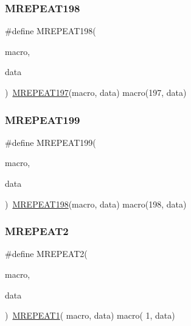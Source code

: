 \mbox{\label{group__group__sam0__utils__mrepeat_ga4061c0d7ba556ac993f2bcca14dd479c}} 
\subsubsection{\texorpdfstring{MREPEAT198}{MREPEAT198}}
{\footnotesize\ttfamily \#define M\+R\+E\+P\+E\+A\+T198(\begin{DoxyParamCaption}\item[{}]{macro,  }\item[{}]{data }\end{DoxyParamCaption})~\mbox{\hyperlink{group__group__sam0__utils__mrepeat_ga8d5a1466ff85f6b12ce43dd9a5edf7e5}{M\+R\+E\+P\+E\+A\+T197}}(macro, data)   macro(197, data)}

\mbox{\label{group__group__sam0__utils__mrepeat_gae89c87df1febe41c657bbbff536a77fa}} 
\subsubsection{\texorpdfstring{MREPEAT199}{MREPEAT199}}
{\footnotesize\ttfamily \#define M\+R\+E\+P\+E\+A\+T199(\begin{DoxyParamCaption}\item[{}]{macro,  }\item[{}]{data }\end{DoxyParamCaption})~\mbox{\hyperlink{group__group__sam0__utils__mrepeat_ga4061c0d7ba556ac993f2bcca14dd479c}{M\+R\+E\+P\+E\+A\+T198}}(macro, data)   macro(198, data)}

\mbox{\label{group__group__sam0__utils__mrepeat_gad5dcb0f9f91771b2e3e42b48d347cb76}} 
\subsubsection{\texorpdfstring{MREPEAT2}{MREPEAT2}}
{\footnotesize\ttfamily \#define M\+R\+E\+P\+E\+A\+T2(\begin{DoxyParamCaption}\item[{}]{macro,  }\item[{}]{data }\end{DoxyParamCaption})~\mbox{\hyperlink{group__group__sam0__utils__mrepeat_ga3abc77fc72ae2dcdd787ac5f2468312e}{M\+R\+E\+P\+E\+A\+T1}}(  macro, data)   macro(  1, data)}

